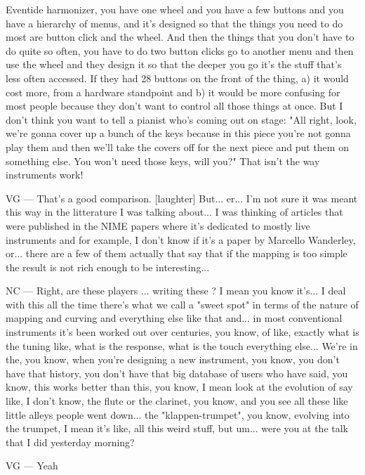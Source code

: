 Eventide harmonizer, you have one wheel and you have a few buttons and you have a hierarchy of menus, and it's designed so that the things you need to do most are button click and the wheel. And then the things that you don't have to do quite so often, you have to do two button clicks go to another menu and then use the wheel and they design it so that the deeper you go it's the stuff that's less often accessed. If they had 28 buttons on the front of the thing, a) it would cost more, from a hardware standpoint and b) it would be more confusing for most people because they don't want to control all those things at once. But I don't think you want to tell a pianist who's coming out on stage: "All right, look, we're gonna cover up a bunch of the keys because in this piece you're not gonna play them and then we'll take the covers off for the next piece and put them on something else. You won't need those keys, will you?" That isn't the way instruments work! 

VG — That's a good comparison. [laughter] But... er... I'm not sure it was meant this way in the litterature I was talking about... I was thinking of articles that were published in the NIME papers where it's dedicated  to mostly live instruments and for example, I don't know if it's a paper by Marcello Wanderley, or... there are a few of them actually  that say that if the mapping is too simple the result is not rich enough to be interesting... 

NC — Right, are these players ... writing these ? I mean you know it's... I deal with this all the time there's what we call a "sweet spot" in terms of the nature of mapping and curving and everything else like that and... in most conventional instruments it's been worked out over centuries, you know, of like, exactly what is the tuning like, what is the response, what is the touch everything else... We're in the, you know, when you're designing a new instrument, you know, you don't have that history, you don't have that big database of users who have said, you know, this works better than this, you know, I mean look at the evolution of say like, I don't know, the flute or the clarinet, you know, and you see all these like little alleys people went down... the "klappen-trumpet", you know, evolving into the trumpet, I mean it's like, all this weird stuff, but um... were you at the talk that I did yesterday morning? 

VG — Yeah 

